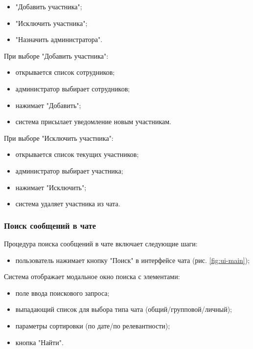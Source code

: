 \begin{itemize}  
	\item "Добавить участника";  
	\item "Исключить участника";  
	\item "Назначить администратора".  
\end{itemize}

При выборе "Добавить участника":  

\begin{itemize}
	\item открывается список сотрудников;  
	\item администратор выбирает сотрудников;  
	\item нажимает "Добавить";  
	\item система присылает уведомление новым участникам.
\end{itemize}

При выборе "Исключить участника":  

\begin{itemize}
	\item открывается список текущих участников;  
	\item администратор выбирает участника;  
	\item нажимает "Исключить";  
	\item система удаляет участника из чата.  
\end{itemize}

\subsubsection{Поиск сообщений в чате}
Процедура поиска сообщений в чате включает следующие шаги:

\begin{itemize}
	\item пользователь нажимает кнопку "Поиск" в интерфейсе чата (рис. \ref{fig:ui-main});
\end{itemize}

Система отображает модальное окно поиска с элементами:
\begin{itemize}
	\item поле ввода поискового запроса;
	\item выпадающий список для выбора типа чата (общий/групповой/личный);
	\item параметры сортировки (по дате/по релевантности);
	\item кнопка "Найти".
\end{itemize}

